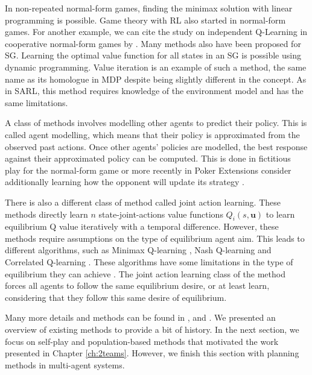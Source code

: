 In non-repeated normal-form games, finding the minimax solution with linear programming \citep{marl-book} is possible.
Game theory with RL also started in normal-form games.
For another example, we can cite the study on independent Q-Learning in cooperative normal-form games by \cite{claus1998dynamics}.
Many methods also have been proposed for SG.
Learning the optimal value function for all states in an SG is possible using dynamic programming.
Value iteration \citep{stochasticGames} is an example of such a method, the same name as its homologue in MDP \citep{sutton2018reinforcement} despite being slightly different in the concept.
As in SARL, this method requires knowledge of the environment model and has the same limitations.

A class of methods involves modelling other agents to predict their policy.
This is called agent modelling, which means that their policy is approximated from the observed past actions.
Once other agents' policies are modelled, the best response against their approximated policy can be computed.
This is done in fictitious play \citep{brown1951iterative} for the normal-form game or more recently in Poker \citep{pmlr-v37-heinrich15} 
Extensions consider additionally learning how the opponent will update its strategy \citep{he2016opponent, foerster2017lola}.

There is also a different class of method called joint action learning.
These methods directly learn $n$ state-joint-actions value functions $Q_i(s, \mathbf{u})$ to learn equilibrium Q value iteratively with a temporal difference.
However, these methods require assumptions on the type of equilibrium agent aim.
This leads to different algorithms, such as Minimax Q-learning \citep{MarkovGames}, Nash Q-learning \citep{hu2003nash} and Correlated Q-learning \citep{greenwald2003correlated}.
These algorithms have some limitations in the type of equilibrium they can achieve \citep{marl-book}.
The joint action learning class of the method forces all agents to follow the same equilibrium desire, or at least learn, considering that they follow this same desire of equilibrium.

Many more details and methods can be found in \citep{marl-book}, \citep{Nowe2012GTMARL} and \citep{russel2010}.
We presented an overview of existing methods to provide a bit of history.
In the next section, we focus on self-play and population-based methods that motivated the work presented in Chapter \ref{ch:2teams}.
However, we finish this section with planning methods in multi-agent systems.

